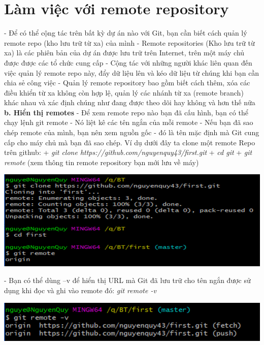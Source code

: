 \documentclass[12pt,a4paper]{report}
\begin{document}
\section{Làm việc với remote repository}
\hspace{0.6cm}{\bf a. Tổng quan} \vskip 0.4cm
- Để có thể cộng tác trên bất kỳ dự án nào với Git, bạn cần biết cách quản lý remote repo (kho lưu trữ từ xa) của mình\vskip 0.4cm
- Remote repositories (Kho lưu trữ từ xa) là các phiên bản của dự án được lưu trữ trên Internet,  trên một máy chủ được được các tổ chức cung cấp\vskip 0.4cm
- Cộng tác với những người khác liên quan đến việc quản lý remote repo này, đẩy dữ liệu lên và kéo dữ liệu  từ chúng khi bạn cần chia sẻ công việc\vskip 0.4cm
- Quản lý remote repository bao gồm biết cách thêm, xóa các điều khiển từ xa không còn hợp lệ, quản lý các nhánh từ xa (remote branch) khác nhau và xác định chúng như đang được theo dõi hay không và hơn thế nữa\vskip 0.4cm
{\bf b. Hiển thị remotes} \vskip 0.4cm
- Để xem remote repo nào bạn đã cấu hình, bạn có thể chạy lệnh git remote\vskip 0.4cm
- Nó liệt kê các tên ngắn của mỗi remote\vskip 0.4cm
- Nếu bạn đã sao chép remote của mình, bạn nên xem nguồn gốc - đó là tên mặc định mà Git cung cấp cho máy chủ mà bạn đã sao chép. Ví dụ dưới đây ta clone một remote Repo trên github:\vskip 0.4cm
+ \textit{git clone https://github.com/nguyenquy43/first.git}\vskip 0.4cm
+ \textit{cd git}\vskip 0.4cm
+ \textit{git remote} (xem thông tin remote repository bạn mới lưu về máy)\vskip 0.4cm

	\includegraphics[width=0.8\linewidth]{screenshot032}
	
	\label{fig:screenshot032}
\vskip 0.4cm\vskip 0.4cm
- Bạn có thể dùng –v để hiển thị URL mà Git đã lưu trữ cho tên ngắn được sử dụng khi đọc và ghi vào remote đó: {\it git remote -v}\vskip 0.4cm

	\includegraphics[width=0.8\linewidth]{screenshot033}
	
\end{document}
